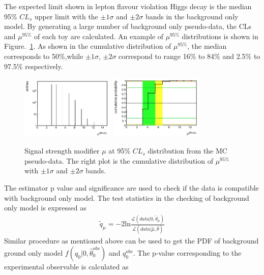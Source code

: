 The expected limit shown in lepton flavour violation Higgs decay is the median 95\% $CL_{s}$ upper limit with the $\pm 1 \sigma$ and $\pm 2 \sigma$ bands in the background only model. By generating a large number of background only pseudo-data, the CLs and $\mu^{95\%}$ of each toy are calculated. An example of $\mu^{95\%}$ distributions is shown in Figure.~\ref{fig:Signal_strength_example}. As shown in the cumulative distribution of $\mu^{95\%}$, the median corresponds to 50\%,while $\pm 1 \sigma$, $\pm 2 \sigma$  correspond to range 16\% to 84\% and 2.5\% to 97.5\% respectively.     
\begin{figure}[!tbp] 
\centering
\includegraphics[width=0.4\textwidth]{chapter7/Signal_strength_example_1.png}
\includegraphics[width=0.4\textwidth]{chapter7/Signal_strength_example_2.png}
\caption{Signal strength modifier $\mu$ at 95\% $CL_{s}$ distribution from the MC pseudo-data. The right plot is the cumulative distribution of $\mu^{95\%}$ with $\pm 1 \sigma$ and $\pm 2 \sigma$ bands.}
\label{fig:Signal_strength_example}
\end{figure}

The estimator p value and significance are used to check if the data is compatible with background only model. The test statistics in the checking of background only model is expressed as
\begin{align*}
\tilde{q}_{\mu}=-2\textrm{ln}\frac{\mathcal{L}(data|0,\tilde{\theta}_{\mu})}{\mathcal{L}(data|\hat{\mu},\hat{\theta})}
\end{align*}
Similar procedure as mentioned above can be used to get the PDF of background ground only model $f(q_{0}|0,\hat{\theta}^{obs}_{0})$ and $q^{obs}_{0}$. The p-value corresponding to the experimental observable is calculated as

